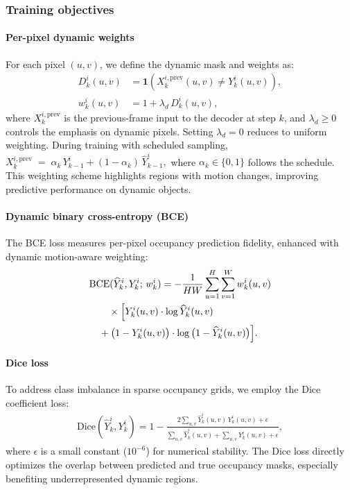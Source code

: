 \subsubsection{Training objectives}

\paragraph{Per-pixel dynamic weights}
For each pixel $(u,v)$, we define the dynamic mask and weights as:
\begin{align}
D^i_k(u,v) &= \mathbf{1}\!\left(X^{i,\mathrm{prev}}_k(u,v) \neq Y^i_k(u,v)\right), \\
w^i_k(u,v) &= 1 + \lambda_d\, D^i_k(u,v),
\label{eq:dynmask_weights_pixel}
\end{align}
where $X^{i,\mathrm{prev}}_k$ is the previous-frame input to the decoder at step $k$, and $\lambda_d \ge 0$ controls the emphasis on dynamic pixels. Setting $\lambda_d=0$ reduces to uniform weighting. During training with scheduled sampling,
$X^{i,\mathrm{prev}}_k \;=\; \alpha_k\,Y^i_{k-1} + (1-\alpha_k)\,\widehat{Y}^i_{k-1},$
where $\alpha_k\in\{0,1\}$ follows the schedule.
This weighting scheme highlights regions with motion changes, improving predictive performance on dynamic objects.

\paragraph{Dynamic binary cross-entropy (BCE)}
The BCE loss measures per-pixel occupancy prediction fidelity, enhanced with dynamic motion-aware weighting:
\begin{align}
&\mathrm{BCE}(\widehat{Y}^i_k, Y^i_k;\, w^i_k)
= - \frac{1}{HW} \sum_{u=1}^{H} \sum_{v=1}^{W} w^i_k(u,v) \notag \\
&\qquad \times \Bigl[
    Y^i_k(u,v) \cdot \log \widehat{Y}^i_k(u,v) \notag \\
&\quad + \big(1-Y^i_k(u,v)\big) \cdot \log \big(1-\widehat{Y}^i_k(u,v)\big)
\Bigr].
\label{eq:bce_loss}
\end{align}

\paragraph{Dice loss}
To address class imbalance in sparse occupancy grids, we employ the Dice coefficient loss:
\begin{align}
\mathrm{Dice}(\widehat{Y}^i_k, Y^i_k)
= 1 - \frac{2 \sum\limits_{u,v} \widehat{Y}^i_k(u,v) \, Y^i_k(u,v) + \epsilon}
              {\sum\limits_{u,v} \widehat{Y}^i_k(u,v) + \sum\limits_{u,v} Y^i_k(u,v) + \epsilon},
\label{eq:dice_loss}
\end{align}
where $\epsilon$ is a small constant ($10^{-6}$) for numerical stability. The Dice loss directly optimizes the overlap between predicted and true occupancy masks, especially benefiting underrepresented dynamic regions.

